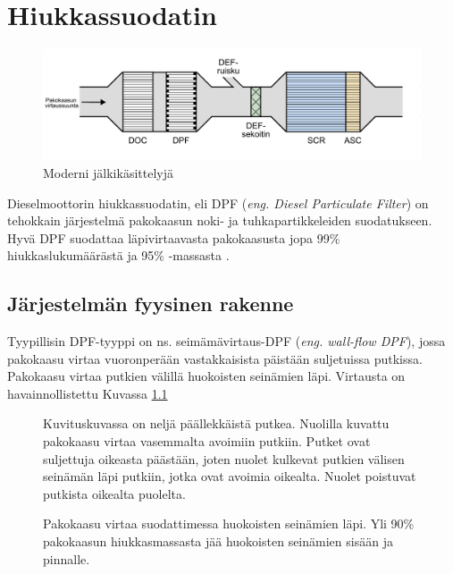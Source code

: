 \chapter{Hiukkassuodatin}%
\label{ch:dpf}



\begin{figure}[H]
    \centering
    \includegraphics[width=\textwidth]{figures/EAT.pdf}
    \caption{Moderni jälkikäsittelyjä}
\end{figure}


Dieselmoottorin hiukkassuodatin, eli DPF (\emph{eng. Diesel Particulate Filter}) on tehokkain järjestelmä pakokaasun noki- ja tuhkapartikkeleiden suodatukseen. 
Hyvä DPF suodattaa läpivirtaavasta pakokaasusta jopa 99\% hiukkaslukumäärästä ja 95\% -massasta \cite{Yan_state_of_the_art}. 


\section{Järjestelmän fyysinen rakenne}

Tyypillisin DPF-tyyppi on ns. seimämävirtaus-DPF (\emph{eng. wall-flow DPF}), jossa pakokaasu virtaa vuoronperään vastakkaisista päistään suljetuissa putkissa. Pakokaasu virtaa putkien välillä huokoisten seinämien läpi. Virtausta on havainnollistettu Kuvassa \ref{fig:wall-flow-dpf}  


\begin{figure}[H]
    \centering 
    
    \pdftooltip{}
                {Kuvituskuvassa on neljä päällekkäistä putkea. Nuolilla kuvattu pakokaasu virtaa vasemmalta avoimiin putkiin. Putket ovat suljettuja oikeasta päästään, joten nuolet kulkevat putkien välisen seinämän läpi putkiin, jotka ovat avoimia oikealta. Nuolet poistuvat putkista oikealta puolelta.
                }
    \caption{Pakokaasu virtaa suodattimessa huokoisten seinämien läpi. Yli 90\% pakokaasun hiukkasmassasta jää huokoisten seinämien sisään ja pinnalle.}
    \label{fig:wall-flow-dpf}
\end{figure}



